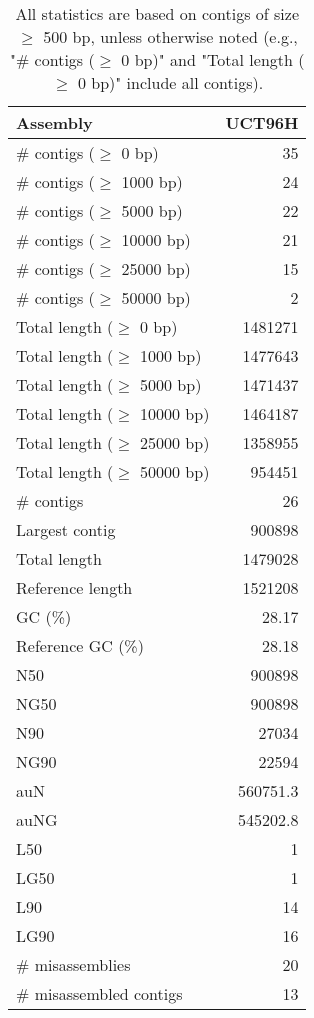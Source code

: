 \documentclass[12pt,a4paper]{article}
\begin{document}
\begin{table}[ht]
\begin{center}
\caption{All statistics are based on contigs of size $\geq$ 500 bp, unless otherwise noted (e.g., "\# contigs ($\geq$ 0 bp)" and "Total length ($\geq$ 0 bp)" include all contigs).}
\begin{tabular}{|l*{1}{|r}|}
\hline
Assembly & UCT96H \\ \hline
\# contigs ($\geq$ 0 bp) & 35 \\ \hline
\# contigs ($\geq$ 1000 bp) & 24 \\ \hline
\# contigs ($\geq$ 5000 bp) & 22 \\ \hline
\# contigs ($\geq$ 10000 bp) & 21 \\ \hline
\# contigs ($\geq$ 25000 bp) & 15 \\ \hline
\# contigs ($\geq$ 50000 bp) & 2 \\ \hline
Total length ($\geq$ 0 bp) & 1481271 \\ \hline
Total length ($\geq$ 1000 bp) & 1477643 \\ \hline
Total length ($\geq$ 5000 bp) & 1471437 \\ \hline
Total length ($\geq$ 10000 bp) & 1464187 \\ \hline
Total length ($\geq$ 25000 bp) & 1358955 \\ \hline
Total length ($\geq$ 50000 bp) & 954451 \\ \hline
\# contigs & 26 \\ \hline
Largest contig & 900898 \\ \hline
Total length & 1479028 \\ \hline
Reference length & 1521208 \\ \hline
GC (\%) & 28.17 \\ \hline
Reference GC (\%) & 28.18 \\ \hline
N50 & 900898 \\ \hline
NG50 & 900898 \\ \hline
N90 & 27034 \\ \hline
NG90 & 22594 \\ \hline
auN & 560751.3 \\ \hline
auNG & 545202.8 \\ \hline
L50 & 1 \\ \hline
LG50 & 1 \\ \hline
L90 & 14 \\ \hline
LG90 & 16 \\ \hline
\# misassemblies & 20 \\ \hline
\# misassembled contigs & 13 \\ \hline

\end{tabular}
\end{center}
\end{table}
\end{document}
